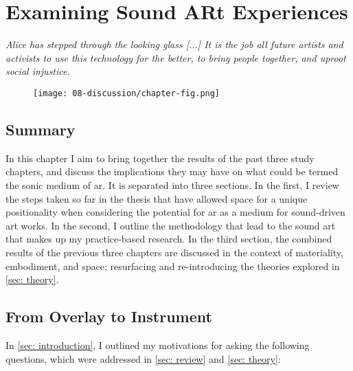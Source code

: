 \chapter{Examining Sound ARt Experiences}
\label{sec: discussion}
\epigraph{\emph{Alice has stepped through the looking glass [...] It is the job all future artists and activists to use this technology for the better, to bring people together, and uproot social injustice.}}{\citep[]{skwarek2018}}

\begin{figure}
    \centering
    \texttt{[image: 08-discussion/chapter-fig.png]}
    \captionsetup{labelformat=empty}
    \caption[Participants experiencing and demonstrating usage of Project North Star (own photographs)]{}
\end{figure}

\clearpage
\section{Summary}\label{sec: discussion-summary}
In this chapter I aim to bring together the results of the past three study chapters, and discuss the implications they may have on what could be termed the sonic medium of \gls{ar}. It is separated into three sections. In the first, I review the steps taken so far in the thesis that have allowed space for a unique positionality when considering the potential for \gls{ar} as a medium for sound-driven art works. In the second, I outline the methodology that lead to the sound \gls{art} that makes up my practice-based research. In the third section, the combined results of the previous three chapters are discussed in the context of materiality, embodiment, and space; resurfacing and re-introducing the theories explored in \autoref{sec: theory}.
\section{From Overlay to Instrument}\label{sec: discussion-review}
In \autoref{sec: introduction}, I outlined my motivations for asking the following questions, which were addressed in \autoref{sec: review} and \autoref{sec: theory}: 

